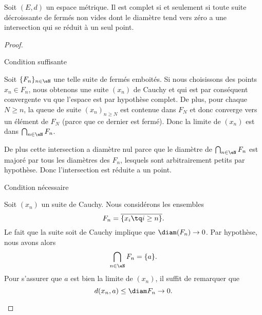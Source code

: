 \begin{theorem}   \label{ThoCQAcZxX}
    Soit \( (E,d)\) un espace métrique. Il est complet si et seulement si toute suite décroissante de fermés non vides dont le diamètre tend vers zéro a une intersection qui se réduit à un seul point.
\end{theorem}

\begin{proof}
    \begin{subproof}
    \item[Condition suffisante]

        Soit \( \{ F_n \}_{n\in \eN}\) une telle suite de fermés emboités. Si nous choisissons des points \( x_n\in F_n\), nous obtenons une suite \( (x_n)\) de Cauchy et qui est par conséquent convergente vu que l'espace est par hypothèse complet. De plus, pour chaque \( N\geq n\), la queue de suite \( (x_n)_{n\geq N}\) est contenue dans \( F_N\) et donc converge vers un élément de \( F_N\) (parce que ce dernier est fermé). Donc la limite de \( (x_n)\) est dans \( \bigcap_{n\in \eN}F_n\).

        De plus cette intersection a diamètre nul parce que le diamètre de \( \bigcap_{n\in \eN}F_n\) est majoré par tous les diamètres des \( F_n\), lesquels sont arbitrairement petits par hypothèse. Donc l'intersection est réduite a un point.

    \item[Condition nécessaire]

        Soit \( (x_n)\) un suite de Cauchy. Nous considérons les ensembles
        \begin{equation}
            F_n=\overline{ \{ x_i\tq i\geq n \} }.
        \end{equation}
        Le fait que la suite soit de Cauchy implique que \( \diam(F_n)\to 0\). Par hypothèse, nous avons alors
        \begin{equation}
            \bigcap_{n\in \eN}F_n=\{ a \}.
        \end{equation}
        Pour s'assurer que \( a\) est bien la limite de \( (x_n)\), il suffit de remarquer que
        \begin{equation}
            d(x_n,a)\leq \diam F_n\to 0.
        \end{equation}
    \end{subproof}
\end{proof}

